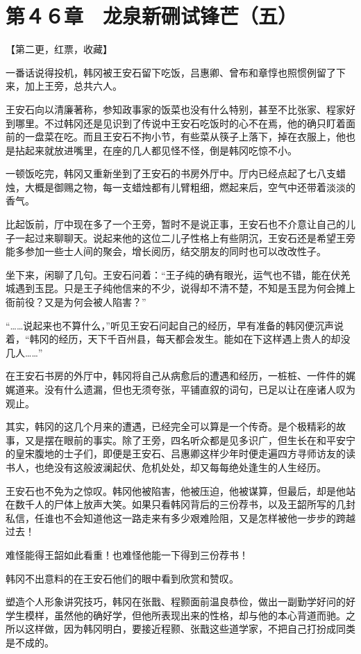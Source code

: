 \section{第４６章　龙泉新硎试锋芒（五）}

【第二更，红票，收藏】

一番话说得投机，韩冈被王安石留下吃饭，吕惠卿、曾布和章惇也照惯例留了下来，加上王旁，总共六人。

王安石向以清廉著称，参知政事家的饭菜也没有什么特别，甚至不比张家、程家好到哪里。不过韩冈还是见识到了传说中王安石吃饭时的心不在焉，他的确只盯着面前的一盘菜在吃。而且王安石不拘小节，有些菜从筷子上落下，掉在衣服上，他也是拈起来就放进嘴里，在座的几人都见怪不怪，倒是韩冈吃惊不小。

一顿饭吃完，韩冈又重新坐到了王安石的书房外厅中。厅内已经点起了七八支蜡烛，大概是御赐之物，每一支蜡烛都有儿臂粗细，燃起来后，空气中还带着淡淡的香气。

比起饭前，厅中现在多了一个王旁，暂时不是说正事，王安石也不介意让自己的儿子一起过来聊聊天。说起来他的这位二儿子性格上有些阴沉，王安石还是希望王旁能多参加一些士人间的聚会，增长阅历，结交朋友的同时也可以改改性子。

坐下来，闲聊了几句。王安石问着：“王子纯的确有眼光，运气也不错，能在伏羌城遇到玉昆。只是王子纯他信来的不少，说得却不清不楚，不知是玉昆为何会摊上衙前役？又是为何会被人陷害？”

“……说起来也不算什么，”听见王安石问起自己的经历，早有准备的韩冈便沉声说着，“韩冈的经历，天下千百州县，每天都会发生。能如在下这样遇上贵人的却没几人……”

在王安石书房的外厅中，韩冈将自己从病愈后的遭遇和经历，一桩桩、一件件的娓娓道来。没有什么遗漏，但也无须夸张，平铺直叙的词句，已足以让在座诸人叹为观止。

其实，韩冈的这几个月来的遭遇，已经完全可以算是一个传奇。是个极精彩的故事，又是摆在眼前的事实。除了王旁，四名听众都是见多识广，但生长在和平安宁的皇宋腹地的士子们，即便是王安石、吕惠卿这样少年时便走遍四方寻师访友的读书人，也绝没有这般波澜起伏、危机处处，却又每每绝处逢生的人生经历。

王安石也不免为之惊叹。韩冈他被陷害，他被压迫，他被谋算，但最后，却是他站在数千人的尸体上放声大笑。如果只看韩冈背后的三份荐书，以及王韶所写的几封私信，任谁也不会知道他这一路走来有多少艰难险阻，又是怎样被他一步步的跨越过去！

难怪能得王韶如此看重！也难怪他能一下得到三份荐书！

韩冈不出意料的在王安石他们的眼中看到欣赏和赞叹。

塑造个人形象讲究技巧，韩冈在张戬、程颢面前温良恭俭，做出一副勤学好问的好学生模样，虽然他的确好学，但他所表现出来的性格，却与他的本心背道而驰。之所以这样做，因为韩冈明白，要接近程颢、张戬这些道学家，不把自己打扮成同类是不成的。

